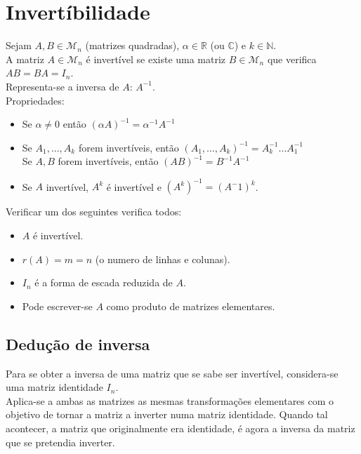 \documentclass[]{report}
\begin{document}
\section{Invertíbilidade}
Sejam $A, B \in \mathcal{M}_{n}$ (matrizes quadradas), $\alpha \in \mathbb{R}$ 
(ou $\mathbb{C}$) e $k \in \mathbb{N}$.\\
A matriz $A \in \mathcal{M}_{n}$ é invertível se existe uma matriz $B \in \mathcal{M}_{n}$ que verifica $AB = BA = I_n$.\\
Representa-se a inversa de $A$: $A^{-1}$.\\[0.2cm]
Propriedades:
\begin{itemize}
\item Se $\alpha \neq 0$ então $(\alpha A)^{-1} = \alpha^{-1}A^{-1}$
\item Se $A_1, \dots, A_{k}$ forem invertíveis, então $(A_1, \dots, A_k)^{-1} = A_k^{-1} \dots A_1^{-1}$\\
\indent Se $A,B$ forem invertíveis, então $(AB)^{-1} = B^{-1} A^{-1}$
\item Se $A$ invertível, $A^k$ é invertível e $(A^k)^{-1} = (A^-1)^k$.
\end{itemize}
Verificar um dos seguintes verifica todos:
\begin{itemize}
\item $A$ é invertível.
\item $r(A) = m = n$ (o numero de linhas e colunas).
\item $I_n$ é a forma de escada reduzida de $A$.
\item Pode escrever-se $A$ como produto de matrizes elementares.
\end{itemize}
\subsection{Dedução de inversa}
Para se obter a inversa de uma matriz que se sabe ser invertível, considera-se uma matriz identidade $I_n$.\\
Aplica-se a ambas as matrizes as mesmas transformações elementares com o objetivo de tornar a matriz a inverter numa matriz identidade. Quando tal acontecer, a matriz que originalmente era identidade, é agora  a inversa da matriz que se pretendia inverter.
\end{document}
